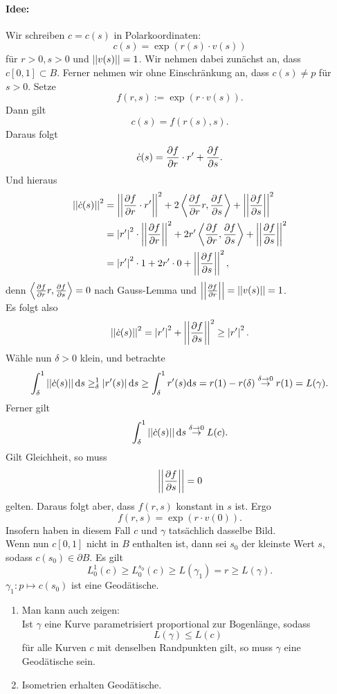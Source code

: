 \begin{Beweis}{}
\paragraph{Idee:} Wir schreiben $c = c(s)$ in Polarkoordinaten:
\[ c(s) = \exp ( r(s) \cdot v(s) ) \]
für $r > 0, s > 0$ und $\left|\left|v(s)\right|\right| = 1$. Wir nehmen dabei zunächst an, dass $c[0,1] \subset B$. Ferner nehmen wir ohne Einschränkung an, dass $c(s)\neq p$ für $s > 0$. Setze
\[ f(r,s) := \exp (r \cdot v(s)). \] 
Dann gilt
\[ c(s) = f(r(s), s). \]
Daraus folgt
\[ \dot{c}(s) = \frac{\partial f}{\partial r} \cdot r' + \frac{\partial f}{\partial s}. \]
Und hieraus
\begin{align*}
\left|\left|\dot{c}(s)\right|\right|^2 &= 
\left|\left|\frac{\partial f}{\partial r} \cdot r' \right|\right|^2 
+ 2 \left<\frac{\partial f}{\partial r} r, \frac{\partial f}{\partial s}\right>
+ \left|\left|\frac{\partial f}{\partial s}\right|\right|^2\\
&= \left|r'\right|^2 \cdot \left|\left|\frac{\partial f}{\partial r}\right|\right|^2
+ 2r' \left< \frac{\partial f}{\partial r}, \frac{\partial f}{\partial s} \right>
+ \left|\left|\frac{\partial f}{\partial s}\right|\right|^2\\
&= \left|r'\right|^2 \cdot 1 + 2r' \cdot 0 + \left|\left|\frac{\partial f}{\partial s}\right|\right|^2,
\end{align*}
denn $\left<\frac{\partial f}{\partial r} r, \frac{\partial f}{\partial s}\right> = 0$ nach Gauss-Lemma und $\left|\left|\frac{\partial f}{\partial r}\right|\right| = \left|\left|v(s)\right|\right| = 1$.\\
Es folgt also
\[ \left|\left|\dot{c}(s)\right|\right|^2 = \left|r'\right|^2 + \left|\left|\frac{\partial f}{\partial s}\right|\right|^2 \geq \left|r'\right|^2. \]
Wähle nun $\delta > 0$ klein, und betrachte
\[ \int_{\delta}^{1} \left|\left|\dot{c}(s)\right|\right| \text{d} s \geq_{\delta}^1 \left|r'(s)\right| \text{d} s \geq \int_{\delta}^1r'(s)\text{d} s = r(1) - r(\delta) \overset{\delta \overset{}{\rightarrow} 0}{\rightarrow} r(1) = L(\gamma).  \]
Ferner gilt
\[ \int_{\delta}^{1} \left|\left|\dot{c}(s)\right|\right| \text{d} s \overset{\delta \overset{}{\rightarrow} 0}{\rightarrow}  L(c).  \]
Gilt Gleichheit, so muss
\[ \left|\left|\frac{\partial f}{\partial s}\right|\right| = 0 \]
gelten. Daraus folgt aber, dass $f(r,s)$ konstant in $s$ ist. Ergo
\[ f(r,s) = \exp (r \cdot v(0)). \]
Insofern haben in diesem Fall $c$ und $\gamma$ tatsächlich dasselbe Bild.\\

Wenn nun $c[0,1]$ nicht in $B$ enthalten ist, dann sei $s_0$ der kleinste Wert $s$, sodass $c(s_0) \in \partial B$. Es gilt
\[ L_0^1(c) \geq L_0^{s_0}(c) \geq L(\gamma_1) = r \geq L(\gamma).\]
$\gamma_1 : p \mapsto c(s_0)$ ist eine Geodätische.
\end{Beweis}

\Bem{}
\begin{enumerate}[1.)]
	\item Man kann auch zeigen:\\
	Ist $\gamma$ eine Kurve parametrisiert proportional zur Bogenlänge, sodass
	\[ L(\gamma) \leq L(c) \]
	für alle Kurven $c$ mit denselben Randpunkten gilt, so muss $\gamma$ eine Geodätische sein.
	\item Isometrien erhalten Geodätische.
\end{enumerate}

